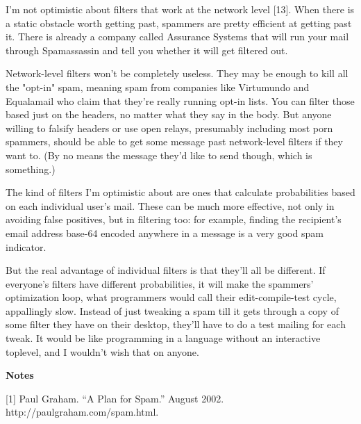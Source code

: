 I'm not optimistic about
                  filters that work at the network level [13]. When there is a
                  static obstacle worth getting past, spammers are pretty
                  efficient at getting past it. There is already a company
                  called Assurance Systems that will run your mail through
                  Spamassassin and tell you whether it will get filtered out.

Network-level
                  filters won't be completely useless. They may be enough to
                  kill all the "opt-in" spam, meaning spam from companies like
                  Virtumundo and Equalamail who claim that they're really
                  running opt-in lists. You can filter those based just on the
                  headers, no matter what they say in the body. But anyone
                  willing to falsify headers or use open relays, presumably
                  including most porn spammers, should be able to get some
                  message past network-level filters if they want to. (By no
                  means the message they'd like to send though, which is
                  something.)

The kind of filters I'm optimistic
                  about are ones that calculate probabilities based on each
                  individual user's mail. These can be much more effective, not
                  only in avoiding false positives, but in filtering too: for
                  example, finding the recipient's email address base-64 encoded
                  anywhere in a message is a very good spam indicator.

But
                  the real advantage of individual filters is that they'll all
                  be different. If everyone's filters have different
                  probabilities, it will make the spammers' optimization loop,
                  what programmers would call their edit-compile-test cycle,
                  appallingly slow. Instead of just tweaking a spam till it gets
                  through a copy of some filter they have on their desktop,
                  they'll have to do a test mailing for each tweak. It would be
                  like programming in a language without an interactive
                  toplevel, and I wouldn't wish that on anyone.



\textbf{Notes}

[1] Paul Graham. ``A Plan for Spam.'' August
                  2002. http://paulgraham.com/spam.html.

